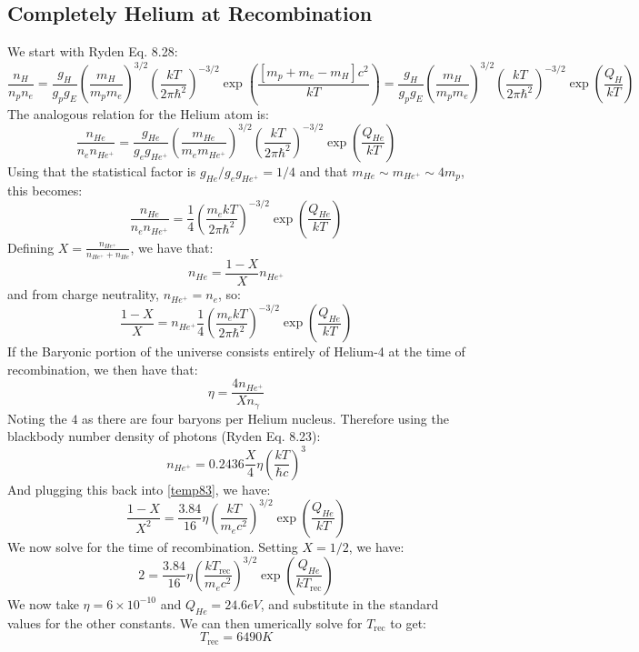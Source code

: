 \subsection{Completely Helium at Recombination}
We start with Ryden Eq. 8.28:
\begin{equation}
    \frac{n_H}{n_pn_e} = \frac{g_H}{g_pg_E}\left(\frac{m_H}{m_p m_e}\right)^{3/2}\left(\frac{kT}{2\pi \hbar^2}\right)^{-3/2}\exp(\frac{[m_p + m_e - m_H]c^2}{kT}) =  \frac{g_H}{g_pg_E}\left(\frac{m_H}{m_p m_e}\right)^{3/2}\left(\frac{kT}{2\pi \hbar^2}\right)^{-3/2}\exp(\frac{Q_H}{kT})
\end{equation}
The analogous relation for the Helium atom is:
\begin{equation}
    \frac{n_{He}}{n_en_{He^+}} = \frac{g_{He}}{g_eg_{He^+}}\left(\frac{m_{He}}{m_e m_{He^+}}\right)^{3/2}\left(\frac{kT}{2\pi \hbar^2}\right)^{-3/2}\exp(\frac{Q_{He}}{kT})
\end{equation}
Using that the statistical factor is $g_{He}/g_eg_{He^+} = 1/4$ and that $m_{He} \sim m_{He^+} \sim 4m_p$, this becomes:
\begin{equation}
    \frac{n_{He}}{n_en_{He^+}} = \frac{1}{4}\left(\frac{m_e k T}{2\pi \hbar^2}\right)^{-3/2}\exp(\frac{Q_{He}}{kT})
\end{equation}
Defining $X = \frac{n_{He^+}}{n_{He^+} + n_{He}}$, we have that:
\begin{equation}
    n_{He} = \frac{1 - X}{X}n_{He^+}
\end{equation}
and from charge neutrality, $n_{He^+} = n_e$, so:
\begin{equation}\label{temp83}
    \frac{1 - X}{X} = n_{He^+}\frac{1}{4}\left(\frac{m_e kT}{2\pi \hbar^2}\right)^{-3/2}\exp(\frac{Q_{He}}{kT})
\end{equation}
If the Baryonic portion of the universe consists entirely of Helium-4 at the time of recombination, we then have that:
\begin{equation}
    \eta = \frac{4n_{He^+}}{X n_\gamma}
\end{equation}
Noting the $4$ as there are four baryons per Helium nucleus. Therefore using the blackbody number density of photons (Ryden Eq. 8.23):
\begin{equation}
    n_{He^+} = 0.2436\frac{X}{4}\eta\left(\frac{kT}{\hbar c}\right)^{3}
\end{equation}
And plugging this back into \eqref{temp83}, we have:
\begin{equation}
    \frac{1 - X}{X^2} = \frac{3.84}{16}\eta\left(\frac{kT}{m_e c^2}\right)^{3/2}\exp(\frac{Q_{He}}{kT})
\end{equation}
We now solve for the time of recombination. Setting $X = 1/2$, we have:
\begin{equation}
    2 = \frac{3.84}{16}\eta\left(\frac{kT_{\text{rec}}}{m_e c^2}\right)^{3/2}\exp(\frac{Q_{He}}{kT_{\text{rec}}})
\end{equation}
We now take $\eta = 6 \times 10^{-10}$ and $Q_{He} = 24.6\si{eV}$, and substitute in the standard values for the other constants. We can then umerically solve for $T_{\text{rec}}$ to get:
\begin{equation}
    \boxed{T_{\text{rec}} = 6490\si{K}}
\end{equation}

